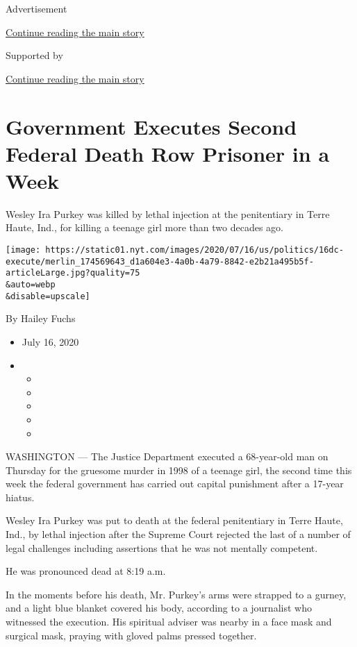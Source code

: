 Advertisement

\protect\hyperlink{after-top}{Continue reading the main story}

Supported by

\protect\hyperlink{after-sponsor}{Continue reading the main story}

\hypertarget{government-executes-second-federal-death-row-prisoner-in-a-week}{%
\section{Government Executes Second Federal Death Row Prisoner in a
Week}\label{government-executes-second-federal-death-row-prisoner-in-a-week}}

Wesley Ira Purkey was killed by lethal injection at the penitentiary in
Terre Haute, Ind., for killing a teenage girl more than two decades ago.

\texttt{[image: https://static01.nyt.com/images/2020/07/16/us/politics/16dc-execute/merlin\_174569643\_d1a604e3-4a0b-4a79-8842-e2b21a495b5f-articleLarge.jpg?quality=75\\\&auto=webp\\\&disable=upscale]}

By Hailey Fuchs

\begin{itemize}
\item
  July 16, 2020
\item
  \begin{itemize}
  \item
  \item
  \item
  \item
  \item
  \end{itemize}
\end{itemize}

WASHINGTON --- The Justice Department executed a 68-year-old man on
Thursday for the gruesome murder in 1998 of a teenage girl, the second
time this week the federal government has carried out capital punishment
after a 17-year hiatus.

Wesley Ira Purkey was put to death at the federal penitentiary in Terre
Haute, Ind., by lethal injection after the Supreme Court rejected the
last of a number of legal challenges including assertions that he was
not mentally competent.

He was pronounced dead at 8:19 a.m.

In the moments before his death, Mr. Purkey's arms were strapped to a
gurney, and a light blue blanket covered his body, according to a
journalist who witnessed the execution. His spiritual adviser was nearby
in a face mask and surgical mask, praying with gloved palms pressed
together.

